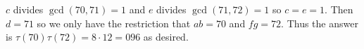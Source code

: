 $c$ divides $\gcd\left(70,71\right)=1$ and $e$ divides $\gcd\left(71,72\right)=1$ so $c=e=1$. Then $d=71$ so we only have the restriction that $ab=70$ and $fg=72$. Thus the answer is $\tau\left(70\right)\tau\left(72\right)=8\cdot12=\boxed{096}$ as desired.